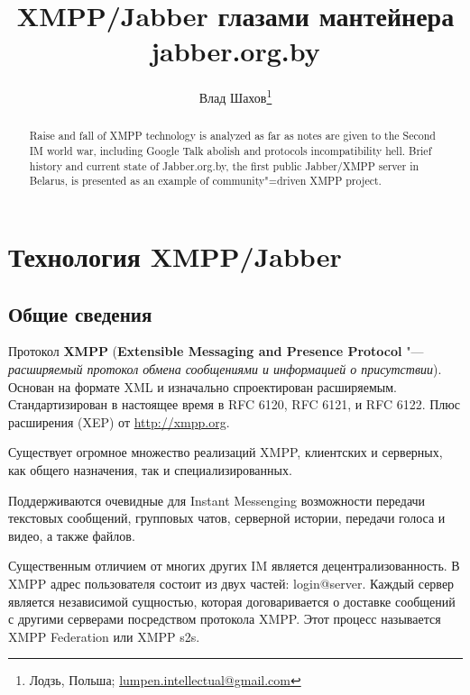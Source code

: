 \documentclass[10pt, a5paper]{article}
\begin{document}
\title{XMPP/Jabber глазами мантейнера jabber.org.by}%

\author{Влад Шахов\footnote{Лодзь, Польша; \url{lumpen.intellectual@gmail.com}}}
\maketitle

\begin{abstract}
Raise and fall of XMPP technology is analyzed as far as notes are given to the Second IM world war, including Google Talk abolish and protocols incompatibility hell. Brief history and current state of Jabber.org.by, the first public  Jabber/XMPP server in Belarus, is presented as an example of community"=driven XMPP project. 
\end{abstract}

\section{Технология XMPP/Jabber}

\subsection{Общие сведения}

Протокол \textbf{XMPP} (\textbf{Extensible Messaging and Presence Protocol} "--- \emph{расширяемый протокол обмена сообщениями и информацией о присутствии}). Основан на формате XML и изначально спроектирован расширяемым. Стандартизирован в настоящее время в RFC 6120, RFC 6121, и RFC 6122. Плюс расширения (XEP) от \url{http://xmpp.org}.

Существует огромное множество реализаций XMPP, клиентских и серверных, как общего назначения, так и специализированных.

Поддерживаются очевидные для Instant Messenging возможности передачи текстовых сообщений, групповых чатов, серверной истории, передачи голоса и видео, а также файлов.

Существенным отличием от многих других IM является децентрализованность. В XMPP адрес пользователя состоит из двух частей: login@server. Каждый сервер является независимой сущностью, которая договаривается о доставке сообщений с другими серверами посредством протокола XMPP. Этот процесс называется XMPP Federation или XMPP s2s.
\end{document}
